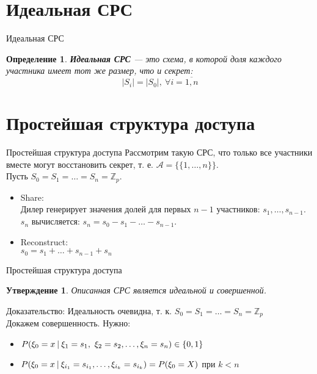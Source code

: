 \documentclass{beamer}
\newtheorem{define}{Определение}
\newtheorem{claim}{Утверждение}
\begin{document}
\section{Идеальная СРС}
\begin{frame}{Идеальная СРС}
    \begin{define}
        \textbf{Идеальная СРС} — это схема, в которой доля каждого участника имеет тот же размер, что и секрет:
        \[
        |S_i| = |S_0|, \ \forall i = \overline{1, n}
        \]
    \end{define}
\end{frame}

\section{Простейшая структура доступа}
\begin{frame}{Простейшая структура доступа}
    Рассмотрим такую СРС, что только все участники вместе могут восстановить секрет, т. е. \(\mathcal{A} = \{ \{1, \dots, n \} \}\). \\
    Пусть \(S_0 = S_1 = \dots = S_n = \mathbb{Z}_p\). \\
    \begin{itemize}
        \item Share: \\
        Дилер генерирует значения долей для первых \(n - 1\) участников: \(s_1, \dots, s_{n - 1}\). \\
        \(s_n\) вычисляется: \(s_n = s_0 - s_1 - \dots - s_{n - 1}\).
        \item Reconstruct: \\
        \(s_0 = s_1 + \dots + s_{n - 1} + s_n\)
    \end{itemize}
\end{frame}

\begin{frame}{Простейшая структура доступа}
    \begin{claim}
        Описанная СРС является идеальной и совершенной.
    \end{claim}
    Доказательство: Идеальность очевидна, т. к. \(S_0 = S_1 = \dots = S_n = \mathbb{Z}_p\) \\
    Докажем совершенность. Нужно:
    \begin{itemize}
        \item \(P(\xi_0 = x \ \vline \ \xi_1 = s_1, \ \xi_2 = s_2, \dots, \xi_n = s_n) \in \{0,1\}\) \\
        \item \(P(\xi_0 = x \ \vline \ \xi_{i_1} = s_{i_1}, \dots, \xi_{i_k} = s_{i_k}) = P(\xi_0 = X)\) при \(k < n\)
    \end{itemize}
\end{frame}
\end{document}
